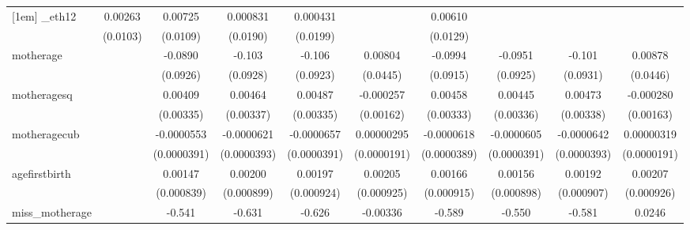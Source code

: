 \begin{table}[htbp]
\begin{tabular}{l*{9}{c}}
[1em]
\_eth12      &     0.00263         &     0.00725         &    0.000831         &    0.000431         &                     &     0.00610         &                     &                     &                     \\
            &    (0.0103)         &    (0.0109)         &    (0.0190)         &    (0.0199)         &                     &    (0.0129)         &                     &                     &                     \\
[1em]
motherage   &                     &     -0.0890         &      -0.103         &      -0.106         &     0.00804         &     -0.0994         &     -0.0951         &      -0.101         &     0.00878         \\
            &                     &    (0.0926)         &    (0.0928)         &    (0.0923)         &    (0.0445)         &    (0.0915)         &    (0.0925)         &    (0.0931)         &    (0.0446)         \\
[1em]
motheragesq &                     &     0.00409         &     0.00464         &     0.00487         &   -0.000257         &     0.00458         &     0.00445         &     0.00473         &   -0.000280         \\
            &                     &   (0.00335)         &   (0.00337)         &   (0.00335)         &   (0.00162)         &   (0.00333)         &   (0.00336)         &   (0.00338)         &   (0.00163)         \\
[1em]
motheragecub&                     &  -0.0000553         &  -0.0000621         &  -0.0000657\sym{*}  &  0.00000295         &  -0.0000618         &  -0.0000605         &  -0.0000642         &  0.00000319         \\
            &                     & (0.0000391)         & (0.0000393)         & (0.0000391)         & (0.0000191)         & (0.0000389)         & (0.0000391)         & (0.0000393)         & (0.0000191)         \\
[1em]
agefirstbirth&                     &     0.00147\sym{*}  &     0.00200\sym{**} &     0.00197\sym{**} &     0.00205\sym{**} &     0.00166\sym{*}  &     0.00156\sym{*}  &     0.00192\sym{**} &     0.00207\sym{**} \\
            &                     &  (0.000839)         &  (0.000899)         &  (0.000924)         &  (0.000925)         &  (0.000915)         &  (0.000898)         &  (0.000907)         &  (0.000926)         \\
[1em]
miss\_motherage&                     &      -0.541         &      -0.631         &      -0.626         &    -0.00336         &      -0.589         &      -0.550         &      -0.581         &      0.0246         \\

\end{tabular}
\end{table}
